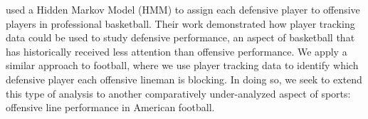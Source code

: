\documentclass[USenglish]{article}
\theoremstyle{dgthm}
\theoremstyle{dgdef}
\begin{document}


\cite{franks2015characterizing} used a Hidden Markov Model (HMM) to assign each defensive player to offensive players in professional basketball.  Their work demonstrated how player tracking data could be used to study defensive performance, an aspect of basketball that has historically received less attention than offensive performance. We apply a similar approach to football, where we use player tracking data to identify which defensive player each offensive lineman is blocking. In doing so, we seek to extend this type of analysis to another comparatively under-analyzed aspect of sports: offensive line performance in American football.
\end{document}

